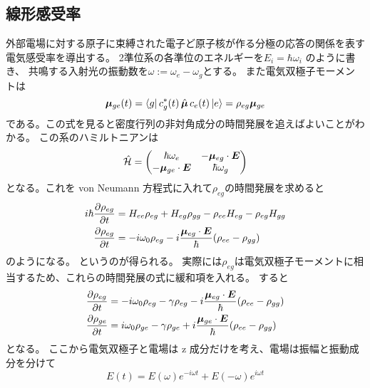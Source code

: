 \documentclass[11pt,dvipdfmx,a4paper]{jsarticle}
\begin{document}
\subsection{線形感受率}
外部電場に対する原子に束縛された電子ど原子核が作る分極の応答の関係を表す電気感受率を導出する。
2準位系の各準位のエネルギーを\(E_i = \hbar \omega_i\) のように書き、
共鳴する入射光の振動数を\(\omega := \omega_e -\omega_g\)とする。
また電気双極子モーメントは
\begin{equation}
	\vb*{\mu}_{ge}(t) = \bra{g}c_g^*(t)\,\hat{\vb*{\mu}}\,c_e(t)\ket{e}
	= \rho_{eg}\vb*{\mu}_{ge}
\end{equation}
である。この式を見ると密度行列の非対角成分の時間発展を追えばよいことがわかる。
この系のハミルトニアンは
\begin{equation}
	\hat{\mathcal{H}} =
	\begin{pmatrix}
		\hbar \omega_e  & -\vb*{\mu}_{eg}\cdot\vb*{E}\\
		-\vb*{\mu}_{ge}\cdot\vb*{E} & \hbar \omega_g
	\end{pmatrix}
\end{equation}
となる。これを von Neumann 方程式に入れて\(\rho_{eg}\)の時間発展を求めると
\begin{align}
	i\hbar \pdv{\rho_{eg}}{t} &= H_{ee}\rho_{eg} + H_{eg}\rho_{gg} - \rho_{ee} H_{eg} - \rho_{eg} H_{gg}\\
	\pdv{\rho_{eg}}{t} &= -i\omega_0\rho_{eg} -i\frac{\vb*{\mu}_{eg}\cdot \vb*{E}}{\hbar}(\rho_{ee}-\rho_{gg})
\end{align}
のようになる。
というのが得られる。
実際には\(\rho_{eg}\)は電気双極子モーメントに相当するため、これらの時間発展の式に緩和項を入れる。
すると
\begin{align}
	\pdv{\rho_{eg}}{t} &= -i\omega_0\rho_{eg} -\gamma\rho_{eg} -i\frac{\vb*{\mu}_{eg}\cdot \vb*{E}}{\hbar}(\rho_{ee}-\rho_{gg})\\
	\pdv{\rho_{ge}}{t} &=  i\omega_0\rho_{ge} -\gamma\rho_{ge} +i\frac{\vb*{\mu}_{ge}\cdot \vb*{E}}{\hbar}(\rho_{ee}-\rho_{gg})
\end{align}
となる。
ここから電気双極子と電場は z 成分だけを考え、電場は振幅と振動成分を分けて
\begin{equation}
	E(t) = E(\omega)e^{-i\omega t} + E(-\omega) e^{i\omega t} \label{eq:E_fourier}
\end{equation}
\end{document}
